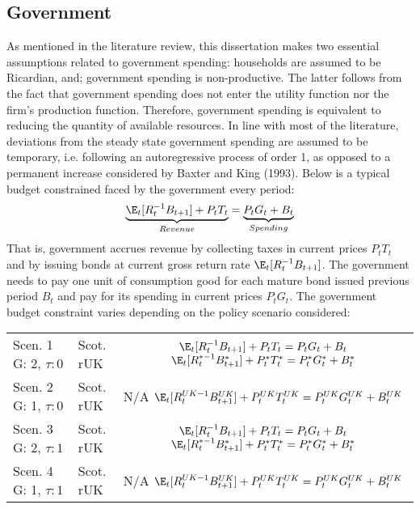 \subsection{Government}

As mentioned in the literature review, this dissertation makes two essential assumptions related to government spending: households are assumed to be Ricardian, and; government spending is non-productive. The latter follows from the fact that government spending does not enter the utility function nor the firm's production function. Therefore, government spending is equivalent to reducing the quantity of available resources. In line with most of the literature, deviations from the steady state government spending are assumed to be temporary, i.e. following an autoregressive process of order 1, as opposed to a permanent increase considered by Baxter and King (1993). Below is a typical budget constrained faced by the government every period:
\begin{align}
    \underbrace{\E_t [R^{-1}_tB_{t+1}] + P_t T_t}_{Revenue} = \underbrace{P_tG_t + B_t}_{Spending}
\end{align}
That is, government accrues revenue by collecting taxes in current prices $P_t T_t$ and by issuing bonds at current gross return rate $\E_t [R^{-1}_tB_{t+1}]$. The government needs to pay one unit of consumption good for each mature bond issued previous period $B_t$ and pay for its spending in current prices $P_t G_t$. The government budget constraint varies depending on the policy scenario considered:
\begin{table}[H]
    \renewcommand{\arraystretch}{2}
    \centering
    \begin{tabular}{l|l|c}
    \makecell{Scen. 1 \\ G: 2, $\tau: 0$} & \makecell{Scot. \\ rUK } & 
        \makecell{
            $\E_t [R^{-1}_tB_{t+1}] + P_t T_t = P_tG_t + B_t$\\
            $\E_t [{R^{*-1}_{t}}B^*_{t+1}] + P^*_tT^*_t = P^*_tG^*_t + B^*_t$
        }  \\ 
    \makecell{Scen. 2 \\ G: 1, $\tau: 0$} & \makecell{Scot. \\ rUK } & 
        \makecell{
            N/A\\
            $\E_t [{R^{UK-1}_{t}}B^{UK}_{t+1}] + P^{UK}_tT^{UK}_t = P^{UK}_tG^{UK}_t + B^{UK}_t$
        }   \\ 
    \makecell{Scen. 3 \\ G: 2, $\tau: 1$} & \makecell{Scot. \\ rUK } & 
    \makecell{
        $\E_t [{R^{-1}_{t}}B_{t+1}] + P_tT_t = P_tG_t + B_t$\\ 
        $\E_t [{R^{*-1}_{t}}B^*_{t+1}] + P^*_tT^*_t = P^*_tG^*_t + B^*_t$
    }  \\
    \makecell{Scen. 4 \\ G: 1, $\tau: 1$} & \makecell{Scot. \\ rUK } & 
    \makecell{
        N/A \\
        $\E_t [{R^{UK-1}_{t}}B^{UK}_{t+1}] + P^{UK}_tT^{UK}_t = P^{UK}_tG^{UK}_t + B^{UK}_t$
    }  
    \end{tabular}
\end{table}

